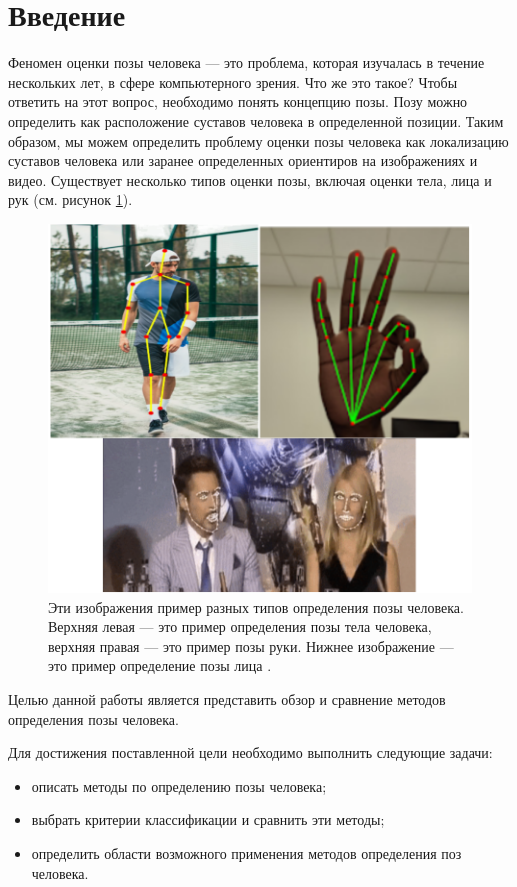 
\chapter*{Введение}


Феномен оценки позы человека --- это проблема, которая изучалась в течение нескольких лет, в сфере компьютерного зрения. Что же это такое? Чтобы ответить на этот вопрос, необходимо понять концепцию позы. Позу можно определить как расположение суставов человека в определенной позиции. Таким образом, мы можем определить проблему оценки позы человека как локализацию суставов человека или заранее определенных ориентиров на изображениях и видео. Существует несколько типов оценки позы, включая оценки тела, лица и рук (см. рисунок \ref{img:human,hand,face}).

\begin{figure}[ht!]
	\centering
	\includegraphics[width=0.96\linewidth]{assets/thefirst.png}
	\caption{Эти изображения пример разных типов определения позы человека. Верхняя левая --- это пример определения позы тела человека, верхняя правая --- это пример позы руки. Нижнее изображение --- это пример определение позы лица \cite{guide-hpe}.}
	\label{img:human,hand,face}
\end{figure}

\newpage
Целью данной работы является представить обзор и сравнение методов определения позы человека. 

Для достижения поставленной цели необходимо выполнить следующие задачи:
\begin{itemize}
	\item описать методы по определению позы человека;
	\item выбрать критерии классификации и сравнить эти методы;
	\item определить области возможного применения методов определения поз человека.
\end{itemize}